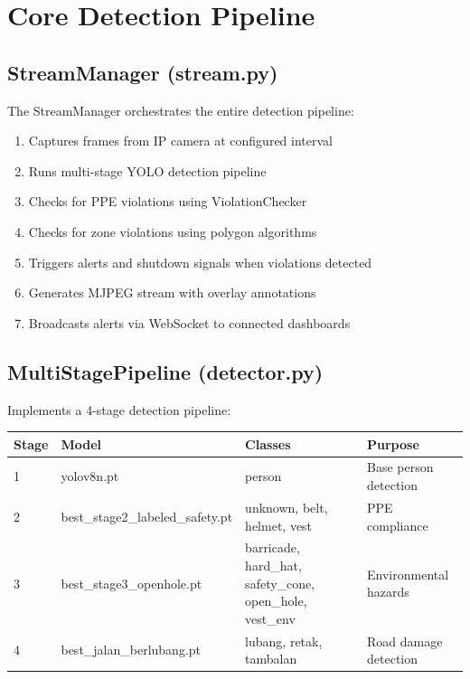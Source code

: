 \documentclass[12pt,a4paper,oneside]{book}
\begin{document}
\section{Core Detection Pipeline}

\subsection{StreamManager (stream.py)}

The StreamManager orchestrates the entire detection pipeline:

\begin{enumerate}
    \item Captures frames from IP camera at configured interval
    \item Runs multi-stage YOLO detection pipeline
    \item Checks for PPE violations using ViolationChecker
    \item Checks for zone violations using polygon algorithms
    \item Triggers alerts and shutdown signals when violations detected
    \item Generates MJPEG stream with overlay annotations
    \item Broadcasts alerts via WebSocket to connected dashboards
\end{enumerate}

\subsection{MultiStagePipeline (detector.py)}

Implements a 4-stage detection pipeline:

\begin{longtable}{|l|l|l|l|}
    \hline
    \textbf{Stage} & \textbf{Model} & \textbf{Classes} & \textbf{Purpose} \\
    \hline
    1 & yolov8n.pt & person & Base person detection \\
    \hline
    2 & best\_stage2\_labeled\_safety.pt & unknown, belt, helmet, vest & PPE compliance \\
    \hline
    3 & best\_stage3\_openhole.pt & barricade, hard\_hat, safety\_cone, open\_hole, vest\_env & Environmental hazards \\
    \hline
    4 & best\_jalan\_berlubang.pt & lubang, retak, tambalan & Road damage detection \\
    \hline
\end{longtable}
\end{document}
